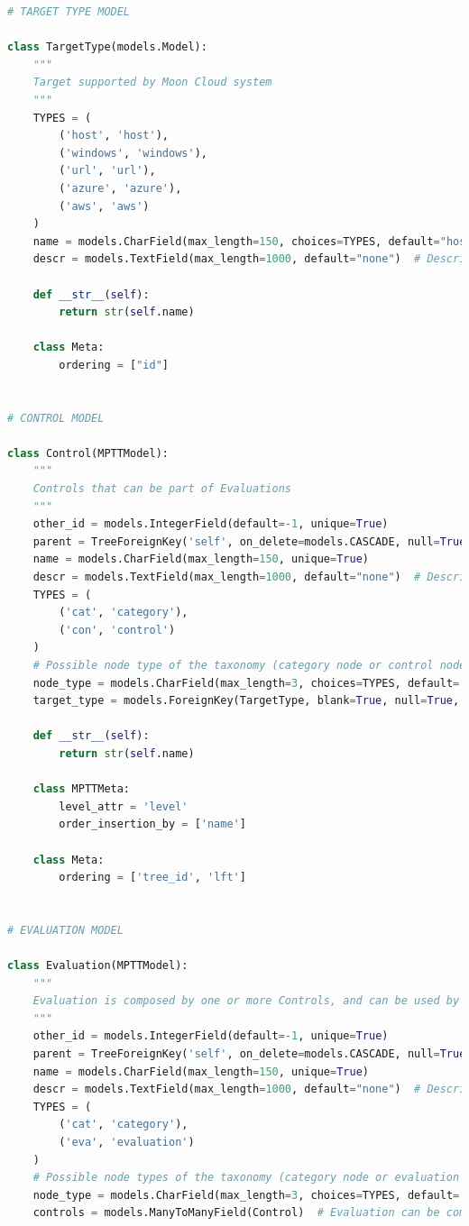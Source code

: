 \begin{lstlisting}[language=Python, label=lst:model, caption={Parti principali del codice dei Models della soluzione.}]
# TARGET TYPE MODEL

class TargetType(models.Model):
    """
    Target supported by Moon Cloud system
    """
    TYPES = (
        ('host', 'host'),
        ('windows', 'windows'),
        ('url', 'url'),
        ('azure', 'azure'),
        ('aws', 'aws')
    )
    name = models.CharField(max_length=150, choices=TYPES, default="host")
    descr = models.TextField(max_length=1000, default="none")  # Description of a target

    def __str__(self):
        return str(self.name)

    class Meta:
        ordering = ["id"]


# CONTROL MODEL

class Control(MPTTModel):
    """
    Controls that can be part of Evaluations
    """
    other_id = models.IntegerField(default=-1, unique=True)
    parent = TreeForeignKey('self', on_delete=models.CASCADE, null=True, blank=True, related_name='children')
    name = models.CharField(max_length=150, unique=True)
    descr = models.TextField(max_length=1000, default="none")  # Description of a node in the taxonomy
    TYPES = (
        ('cat', 'category'),
        ('con', 'control')
    )
    # Possible node type of the taxonomy (category node or control node)
    node_type = models.CharField(max_length=3, choices=TYPES, default='cat')
    target_type = models.ForeignKey(TargetType, blank=True, null=True, on_delete=models.CASCADE)  # It's null for the root node and category nodes

    def __str__(self):
        return str(self.name)

    class MPTTMeta:
        level_attr = 'level'
        order_insertion_by = ['name']

    class Meta:
        ordering = ['tree_id', 'lft']


# EVALUATION MODEL

class Evaluation(MPTTModel):
    """
    Evaluation is composed by one or more Controls, and can be used by Users
    """
    other_id = models.IntegerField(default=-1, unique=True)
    parent = TreeForeignKey('self', on_delete=models.CASCADE, null=True, blank=True, related_name='children')
    name = models.CharField(max_length=150, unique=True)
    descr = models.TextField(max_length=1000, default="none")  # Description of a node in the taxonomy
    TYPES = (
        ('cat', 'category'),
        ('eva', 'evaluation')
    )
    # Possible node types of the taxonomy (category node or evaluation node)
    node_type = models.CharField(max_length=3, choices=TYPES, default='cat')
    controls = models.ManyToManyField(Control)  # Evaluation can be composed of one or more controls


\end{lstlisting}
